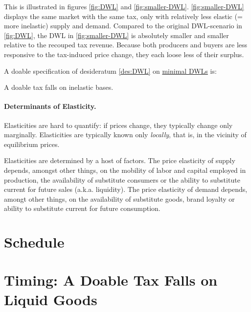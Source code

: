 
This is illustrated in figures \ref{fig:DWL} and \ref{fig:smaller-DWL}. \autoref{fig:smaller-DWL} displays the same market with the same tax, only with relatively less elastic (= more inelastic) supply and demand. Compared to the original DWL-scenario in \autoref{fig:DWL}, the DWL in \autoref{fig:smaller-DWL} is absolutely smaller and smaller relative to the recouped tax revenue. Because both producers and buyers are less responsive to the tax-induced price change, they each loose less of their surplus.

A doable specification of desideratum \ref{des:DWL} on \href{des:DWL}{minimal DWLs} is:

\begin{desideratum}
	A doable tax falls on inelastic bases.
	\label{des:tax-inelastic}
\end{desideratum}

\paragraph{Determinants of Elasticity.} Elasticities are hard to quantify: if prices change, they typically change only marginally. Elasticities are typically known only \emph{locally}, that is, in the vicinity of equilibrium prices.

Elasticities are determined by a host of factors. The price elasticity of supply depends, amongst other things, on the mobility of labor and capital employed in production, the availability of substitute consumers or the ability to substitute current for future sales (a.k.a. liquidity). The price elasticity of demand depends, amongt other things, on the availability of substitute goods, brand loyalty or ability to substitute current for future consumption.

\section[Schedule]{Schedule}


\section[Timing]{Timing: A Doable Tax Falls on Liquid Goods} \label{sec:timing} %

